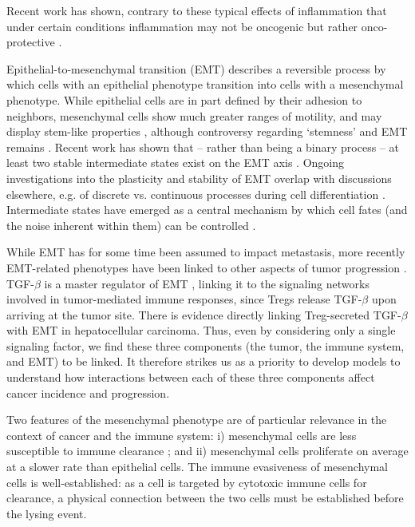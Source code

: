 \documentclass[11pt]{article}
\begin{document}
Recent work has shown, contrary to these typical effects of inflammation that under certain conditions inflammation may not be oncogenic but rather onco-protective \cite{guo17_multiscale}.
\par
Epithelial-to-mesenchymal transition (EMT) describes a reversible process by which cells with an epithelial phenotype transition into cells with a mesenchymal phenotype.
While epithelial cells are in part defined by their adhesion to neighbors, mesenchymal cells show much greater ranges of motility, and may display stem-like properties \cite{nieto2016emt}, although controversy regarding `stemness' and EMT remains \cite{nie18_stem, sha19_intermediate}.  
Recent work has shown that -- rather than being a binary process -- at least two stable intermediate states exist on the EMT axis \cite{hong2015ovol2, jolly15_coupling}.
Ongoing investigations into the plasticity and stability of EMT overlap with discussions elsewhere, e.g. of discrete vs. continuous processes during cell differentiation \cite{moris16_transition}.
Intermediate states have emerged as a central mechanism by which cell fates (and the noise inherent within them) can be controlled \cite{maclean18_exploring, ta16_controlling, rackauckas18_meanindependent}. 
\par 
%
While EMT has for some time been assumed to impact metastasis, more recently EMT-related phenotypes have been linked to other aspects of tumor progression \cite{nieto2016emt,peinado2007snail}.
TGF-$\beta$ is a master regulator of EMT \cite{lim2012epithelial}, linking it to the signaling networks involved in tumor-mediated immune responses, since Tregs release TGF-$\beta$ upon arriving at the tumor site\cite{terry2017new}. 
There is evidence directly linking Treg-secreted TGF-$\beta$ with EMT in hepatocellular carcinoma\cite{shi2019cd4+}.
Thus, even by considering only a single signaling factor, we find these three components (the tumor, the immune system, and EMT) to be linked. It therefore strikes us as a priority to develop models to understand how interactions between each of these three components affect cancer incidence and progression.
\par
Two features of the mesenchymal phenotype are of particular relevance in the context of cancer and the immune system: i) mesenchymal cells are less susceptible to immune clearance \cite{terry2017new}; and ii) mesenchymal cells proliferate on average at a slower rate than epithelial cells.
The immune evasiveness of mesenchymal cells is well-established: as a cell is targeted by cytotoxic immune cells for clearance, a physical connection between the two cells must be established before the lysing event.
\end{document}

